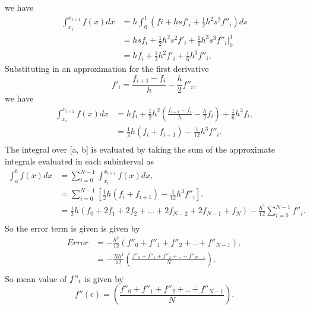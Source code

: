 \documentclass{article}
\begin{document}
we have 
\begin{equation}
\begin{split}
\int_{x_i}^{x_{i+1}}f(x)dx &= h\int_{0}^{1}(fi + hsf'_i + \frac{1}{2}h^2s^2f''_i)ds\\
                                       &= hsf_i + \frac{1}{2}h^2s^2f'_i + \frac{1}{6}h^3s^3f''_i \vert_{0}^{1} \\
                                       &= hf_i + \frac{1}{2}h^2f'_i + \frac{1}{6}h^3f''_i, 
\end{split}
\end{equation}
Substituting in an approximation for the first derivative
\begin{equation}
f'_i = \frac{f_{i+1} - f_i}{h} - \frac{h}{2}f''_i,
\end{equation}
we have
\begin{equation}
\begin{split}
\int_{x_i}^{x_{i+1}}f(x)dx &= h f_i + \frac{1}{2} h^2 \left( \frac{f_{i +1} - f_i}{h} - \frac{h}{2}f_i \right) + \frac{1}{6}h^3 f_i,\\
                                       &= \frac{1}{2} h (f_i + f_{i+1}) - \frac{1}{12} h^3 f''_i.\\
\end{split}
\end{equation}
The integral over [a, b] is evaluated by taking the sum of the approximate integrals evaluated in each subinterval as
\begin{equation}
\begin{split}
\int_{a}^{b}f(x)dx &= \sum_{i = 0}^{N - 1}\int_{x_i}^{x_{i+1}}f(x)dx,\\
                           &= \sum_{i = 0}^{N - 1}\left[\frac{1}{2}h(f_i + f_{i+1}) - \frac{1}{12}h^3f''_i\right].\\
                           &= \frac{1}{2}h(f_0 + 2f_1 + 2f_2 + ... + 2f_{N-2} + 2f_{N-1} + f_N) - \frac{h^3}{12}\sum_{i=0}^{N-1}f''_i.\\
\end{split}
\end{equation}
So the error term is given is given by
\begin{equation}
\begin{split}
Error &= - \frac{h^3}{12}(f''_0 + f''_1 + f''_2 + .. + f''_{N-1}),\\
         &= - \frac{Nh^3}{12}\left(\frac{f''_0 + f''_1 + f''_2 + .. + f''_{N-1}}{N}\right).\\
\end{split}
\end{equation}
So mean value of $f"_i$ is given by
\begin{equation}
f''(\epsilon) = \left(\frac{f''_0 + f''_1 + f''_2 + .. + f''_{N-1}}{N}\right).
\end{equation}
\end{document}
